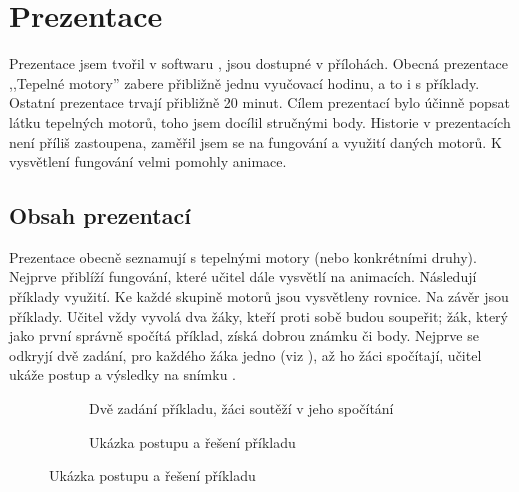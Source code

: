 \section{Prezentace}\label{sc:prezentace}
{Prezentace jsem tvořil v softwaru , jsou dostupné v přílohách. Obecná prezentace ,,Tepelné motory'' zabere přibližně jednu vyučovací hodinu, a to i s příklady. Ostatní prezentace trvají přibližně 20 minut.}\odst
{Cílem prezentací bylo účinně popsat látku tepelných motorů, toho jsem docílil stručnými body. Historie v prezentacích není příliš zastoupena, zaměřil jsem se na fungování a využití daných motorů. K vysvětlení fungování velmi pomohly animace.}
\subsection{Obsah prezentací}
{Prezentace obecně seznamují s tepelnými motory (nebo konkrétními druhy). Nejprve přiblíží fungování, které učitel dále vysvětlí na animacích. Následují příklady využití. Ke každé skupině motorů jsou vysvětleny rovnice.}\odst
{Na závěr jsou příklady. Učitel vždy vyvolá dva žáky, kteří proti sobě budou soupeřit; žák, který jako první správně spočítá příklad, získá dobrou známku či body. Nejprve se odkryjí dvě zadání, pro každého žáka jedno (viz ), až ho žáci spočítají, učitel ukáže postup a výsledky na snímku .}
\begin{figure}[H]
    \begingroup
    \makeatletter
    \renewcommand\thesubfigure{\thefigure~--~\@nameuse{subfiglabel@\alph{subfigure}}}
    \newcommand{\subfiglabel@a}{vlevo}
    \newcommand{\subfiglabel@b}{vpravo}
    \captionsetup[subfigure]{labelformat=simple, labelsep=colon}
    \renewcommand\p@subfigure{}
    \makeatother
    \begin{subfigure}{0.45\textwidth}
        \centering
        \setlength{\fboxsep}{0pt}
        \caption{Dvě zadání příkladu, žáci soutěží v jeho spočítání \jaObr}
        \label{obr:prikladyZadani}
    \end{subfigure}\hfill
    \begin{subfigure}{0.45\textwidth}
        \centering
        \setlength{\fboxsep}{0pt}
        \caption{Ukázka postupu a řešení příkladu \jaObr}
        \label{obr:prikladyReseni}
    \end{subfigure}
    \endgroup
\end{figure}
\newpage
